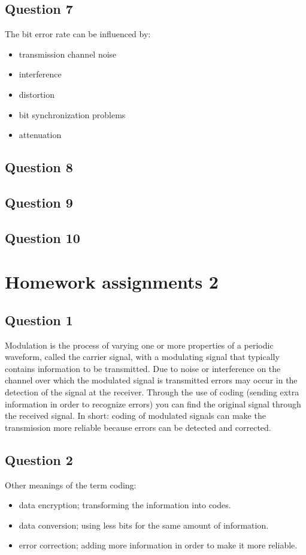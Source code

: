 \documentclass[final]{scrreprt} %
\begin{document}
\subsection{Question 7}
The bit error rate can be influenced by:
\begin{itemize}
\item transmission channel noise
\item interference
\item distortion
\item bit synchronization problems
\item attenuation
\end{itemize}
\subsection{Question 8}
\subsection{Question 9}
\subsection{Question 10}


\section{Homework assignments 2}
\label{sec:homework2}
\subsection{Question 1}
Modulation is the process of varying one or more properties of a periodic waveform, called the carrier signal, with a modulating signal that typically contains information to be transmitted.
Due to noise or interference on the channel over which the modulated signal is transmitted errors may occur in the detection of the signal at the receiver. Through the use of coding (sending extra information in order to recognize errors) you can find the original signal through the received signal. 
In short: coding of modulated signals can make the transmission more reliable because errors can be detected and corrected. 
\subsection{Question 2}
Other meanings of the term coding:
\begin{itemize}
\item data encryption; transforming the information into codes.
\item data conversion;  using less bits for the same amount of information.
\item error correction; adding more information in order to make it more reliable.
\end{itemize}
\end{document}
